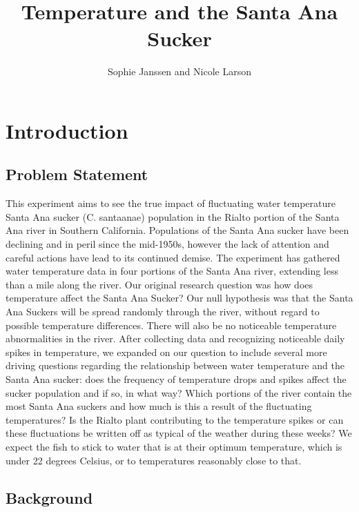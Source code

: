\documentclass{article}\usepackage[]{graphicx}\usepackage[]{color}
\title{Temperature and the Santa Ana Sucker}
\author{Sophie Janssen and Nicole Larson}
\begin{document}
\maketitle

\newpage
\tableofcontents
\newpage

\section{Introduction}

\subsection{Problem Statement}

This experiment aims to see the true impact of fluctuating water temperature Santa Ana sucker (C. santaanae) population in the Rialto portion of the Santa Ana river in Southern California. Populations of the Santa Ana sucker have been declining and in peril since the mid-1950s, however the lack of attention and careful actions have lead to its continued demise. The experiment has gathered water temperature data in four portions of the Santa Ana river, extending less than a mile along the river. Our original research question was how does temperature affect the Santa Ana Sucker? Our null hypothesis was that the Santa Ana Suckers will be spread randomly through the river, without regard to possible temperature differences. There will also be no noticeable temperature abnormalities in the river. After collecting data and recognizing noticeable daily spikes in temperature, we expanded on our question to include several more driving questions regarding the relationship between water temperature and the Santa Ana sucker: does the frequency of temperature drops and spikes affect the sucker population and if so, in what way? Which portions of the river contain the most Santa Ana suckers and how much is this a result of the fluctuating temperatures? Is the Rialto plant contributing to the temperature spikes or can these fluctuations be written off as typical of the weather during these weeks? We expect the fish to stick to water that is at their optimum temperature, which is under 22 degrees Celsius, or to temperatures reasonably close to that. 

\subsection{Background}
\end{document}
